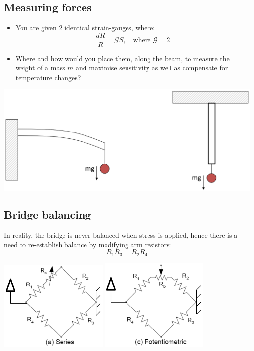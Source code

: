 \documentclass[11pt]{article}
\begin{document}
\subsection{Measuring forces}
\label{sec:org9440e8f}
\begin{itemize}
\item You are given 2 identical strain-gauges, where:
\[\frac{dR}{R} = \mathcal{G} S, \quad \text{where } \mathcal{G} = 2\]
\item Where and how would you place them, along the beam, to measure the weight of a mass \(m\) and maximise sensitivity as well as compensate for temperature changes?
\end{itemize}

\begin{center}
\includegraphics[width=.9\linewidth]{./images/measuring-forces-possible-configurations.png}
\end{center}
\subsection{Bridge balancing}
\label{sec:orge6b0291}
In reality, the bridge is never balanced when stress is applied, hence there is a need to re-establish balance by modifying arm resistors:
\[R_1 R_3 = R_2 R_4\]

\begin{center}
\includegraphics[width=0.40\textwidth]{./images/bridge-balancing-series-circuit-diagram.png}
\includegraphics[width=0.40\textwidth]{./images/bridge-balancing-potentiometric-circuit-diagram.png}
\end{center}
\end{document}

